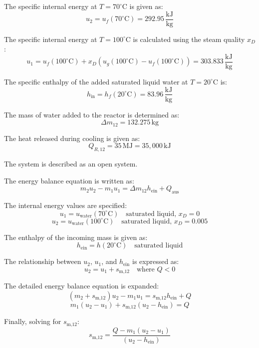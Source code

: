 The specific internal energy at \( T = 70^\circ\text{C} \) is given as:  
\[
u_2 = u_f(70^\circ\text{C}) = 292.95 \, \frac{\text{kJ}}{\text{kg}}
\]

The specific internal energy at \( T = 100^\circ\text{C} \) is calculated using the steam quality \( x_D \):  
\[
u_1 = u_f(100^\circ\text{C}) + x_D \left( u_g(100^\circ\text{C}) - u_f(100^\circ\text{C}) \right) = 303.833 \, \frac{\text{kJ}}{\text{kg}}
\]

The specific enthalpy of the added saturated liquid water at \( T = 20^\circ\text{C} \) is:  
\[
h_{\text{in}} = h_f(20^\circ\text{C}) = 83.96 \, \frac{\text{kJ}}{\text{kg}}
\]

The mass of water added to the reactor is determined as:  
\[
\Delta m_{12} = 132.275 \, \text{kg}
\]

The heat released during cooling is given as:  
\[
Q_{R,12} = 35 \, \text{MJ} = 35,000 \, \text{kJ}
\]  

The system is described as an open system.  

The energy balance equation is written as:  
\[
m_2 u_2 - m_1 u_1 = \Delta m_{12} h_{\text{ein}} + Q_{\text{aus}}
\]  

The internal energy values are specified:  
\[
u_1 = u_{\text{water}}(70^\circ\text{C}) \quad \text{saturated liquid, } x_D = 0
\]  
\[
u_2 = u_{\text{water}}(100^\circ\text{C}) \quad \text{saturated liquid, } x_D = 0.005
\]  

The enthalpy of the incoming mass is given as:  
\[
h_{\text{ein}} = h(20^\circ\text{C}) \quad \text{saturated liquid}
\]  

The relationship between \( u_2 \), \( u_1 \), and \( h_{\text{ein}} \) is expressed as:  
\[
u_2 = u_1 + s_{\text{m,12}} \quad \text{where } Q < 0
\]  

The detailed energy balance equation is expanded:  
\[
(m_2 + s_{\text{m,12}}) u_2 - m_1 u_1 = s_{\text{m,12}} h_{\text{ein}} + Q
\]  
\[
m_1 (u_2 - u_1) + s_{\text{m,12}} (u_2 - h_{\text{ein}}) = Q
\]  

Finally, solving for \( s_{\text{m,12}} \):  
\[
s_{\text{m,12}} = \frac{Q - m_1 (u_2 - u_1)}{(u_2 - h_{\text{ein}})}
\]